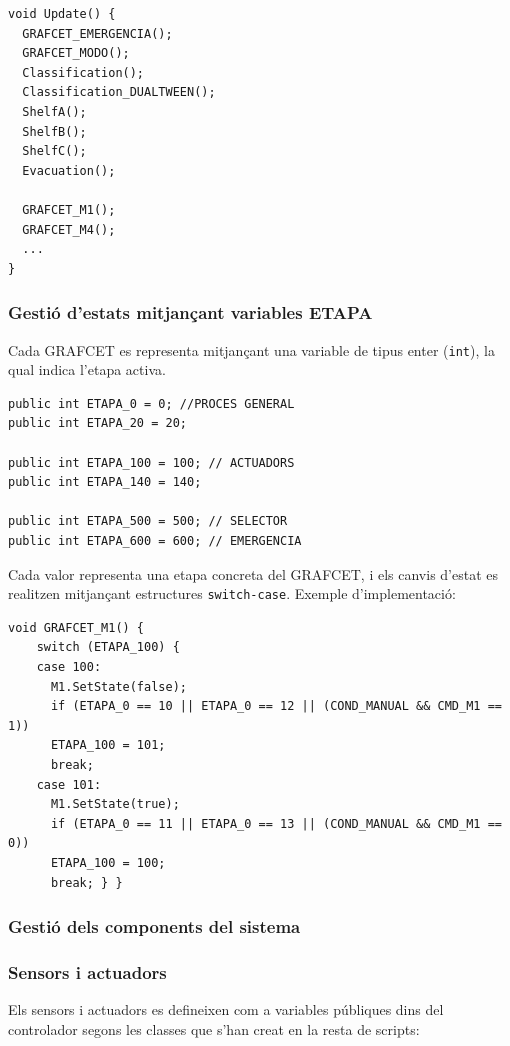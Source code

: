 \documentclass[a4paper,11pt,DIV=13,headings=normal,abstract=true,twoside=semi]{article}
\begin{document}
\begin{lstlisting}[style=simple]
void Update() {
  GRAFCET_EMERGENCIA();
  GRAFCET_MODO();
  Classification();
  Classification_DUALTWEEN();
  ShelfA();
  ShelfB();
  ShelfC();
  Evacuation();

  GRAFCET_M1();
  GRAFCET_M4();
  ...
}
\end{lstlisting}



\subsubsection{Gestió d'estats mitjançant variables ETAPA}

Cada GRAFCET es representa mitjançant una variable de tipus enter (\texttt{int}), la qual indica l'etapa activa.

\begin{lstlisting}[style=simple]
public int ETAPA_0 = 0; //PROCES GENERAL
public int ETAPA_20 = 20;

public int ETAPA_100 = 100; // ACTUADORS
public int ETAPA_140 = 140; 

public int ETAPA_500 = 500; // SELECTOR
public int ETAPA_600 = 600; // EMERGENCIA
\end{lstlisting}

Cada valor representa una etapa concreta del GRAFCET, i els canvis d'estat es realitzen mitjançant estructures \texttt{switch-case}. Exemple d'implementació: 

\begin{lstlisting}[style=simple]
  void GRAFCET_M1() {
    switch (ETAPA_100) {
    case 100: 
      M1.SetState(false);
      if (ETAPA_0 == 10 || ETAPA_0 == 12 || (COND_MANUAL && CMD_M1 == 1)) 
      ETAPA_100 = 101;
      break;
    case 101: 
      M1.SetState(true);
      if (ETAPA_0 == 11 || ETAPA_0 == 13 || (COND_MANUAL && CMD_M1 == 0)) 
      ETAPA_100 = 100;
      break; } }
\end{lstlisting}

\subsubsection{Gestió dels components del sistema}
\subsubsection*{Sensors i actuadors}

Els sensors i actuadors es defineixen com a variables públiques dins del controlador segons les classes que s'han creat en la resta de scripts:
\end{document}

